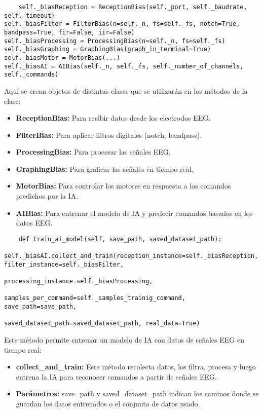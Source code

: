 \documentclass{article}
\begin{document}
\begin{lstlisting}
    self._biasReception = ReceptionBias(self._port, self._baudrate, self._timeout)
self._biasFilter = FilterBias(n=self._n, fs=self._fs, notch=True, bandpass=True, fir=False, iir=False)
self._biasProcessing = ProcessingBias(n=self._n, fs=self._fs)
self._biasGraphing = GraphingBias(graph_in_terminal=True)
self._biasMotor = MotorBias(...)
self._biasAI = AIBias(self._n, self._fs, self._number_of_channels, self._commands)
\end{lstlisting}
Aquí se crean objetos de distintas clases que se utilizarán en los métodos de la clase:
\begin{itemize}
    \item \textbf{ReceptionBias:} Para recibir datos desde los electrodos EEG.
    \item \textbf{FilterBias:} Para aplicar filtros digitales (notch, bandpass).
    \item \textbf{ProcessingBias:} Para procesar las señales EEG.
    \item \textbf{GraphingBias:} Para graficar las señales en tiempo real.
    \item \textbf{MotorBias:} Para controlar los motores en respuesta a los comandos predichos por la IA.
    \item \textbf{AIBias:} Para entrenar el modelo de IA y predecir comandos basados en los datos EEG.
\end{itemize}

\begin{lstlisting}
    def train_ai_model(self, save_path, saved_dataset_path):
    self._biasAI.collect_and_train(reception_instance=self._biasReception, filter_instance=self._biasFilter,
                                   processing_instance=self._biasProcessing, 
                                   samples_per_command=self._samples_trainig_command, save_path=save_path,
                                   saved_dataset_path=saved_dataset_path, real_data=True)

\end{lstlisting}

Este método permite entrenar un modelo de IA con datos de señales EEG en tiempo real:
\begin{itemize}
    \item \textbf{collect\_and\_train:} Este método recolecta datos, los filtra, procesa y luego entrena la IA para reconocer comandos a partir de señales EEG.
    \item \textbf{Parámetros:} save\_path y saved\_dataset\_path indican los caminos donde se guardan los datos entrenados o el conjunto de datos usado.
\end{itemize}
\end{document}
